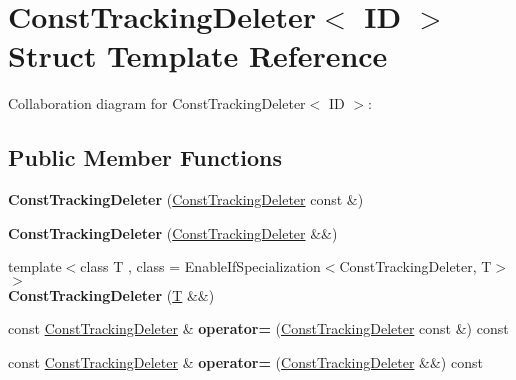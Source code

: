 \hypertarget{struct_const_tracking_deleter}{}\section{Const\+Tracking\+Deleter$<$ ID $>$ Struct Template Reference}
\label{struct_const_tracking_deleter}


Collaboration diagram for Const\+Tracking\+Deleter$<$ ID $>$\+:
\subsection*{Public Member Functions}
\begin{DoxyCompactItemize}
\item 
\mbox{\label{struct_const_tracking_deleter_a784eaeb72c91c3c9f2b4b2e3fc6c824f}} 
{\bfseries Const\+Tracking\+Deleter} (\mbox{\hyperlink{struct_const_tracking_deleter}{Const\+Tracking\+Deleter}} const \&)
\item 
\mbox{\label{struct_const_tracking_deleter_ad378e0e3c5a82bff1e7d34e30f2d1c20}} 
{\bfseries Const\+Tracking\+Deleter} (\mbox{\hyperlink{struct_const_tracking_deleter}{Const\+Tracking\+Deleter}} \&\&)
\item 
\mbox{\label{struct_const_tracking_deleter_a47d97838c77b35be5129c15f048885ae}} 
{\footnotesize template$<$class T , class  = Enable\+If\+Specialization$<$\+Const\+Tracking\+Deleter, T$>$$>$ }\\{\bfseries Const\+Tracking\+Deleter} (\mbox{\hyperlink{struct_t}{T}} \&\&)
\item 
\mbox{\label{struct_const_tracking_deleter_a7cd5f8280b782770ca2e0e11bfdb7bd4}} 
const \mbox{\hyperlink{struct_const_tracking_deleter}{Const\+Tracking\+Deleter}} \& {\bfseries operator=} (\mbox{\hyperlink{struct_const_tracking_deleter}{Const\+Tracking\+Deleter}} const \&) const
\item 
\mbox{\label{struct_const_tracking_deleter_a2395484045d5ce15a7667067b4c0cecd}} 
const \mbox{\hyperlink{struct_const_tracking_deleter}{Const\+Tracking\+Deleter}} \& {\bfseries operator=} (\mbox{\hyperlink{struct_const_tracking_deleter}{Const\+Tracking\+Deleter}} \&\&) const

\end{DoxyCompactItemize}
